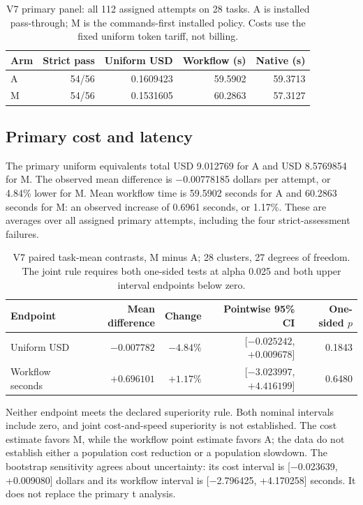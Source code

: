 \documentclass[manuscript,screen,nonacm]{acmart}
\begin{document}
\begin{table}[tbp]
\centering
\caption{V7 primary panel: all 112 assigned attempts on 28 tasks. A is installed pass-through; M is the commands-first installed policy. Costs use the fixed uniform token tariff, not billing.}
\label{tab:v7-arm-means}
\begin{tabular}{lrrrr}
\toprule
Arm & Strict pass & Uniform USD & Workflow (s) & Native (s) \\
\midrule
A & 54/56 & 0.1609423 & 59.5902 & 59.3713 \\
M & 54/56 & 0.1531605 & 60.2863 & 57.3127 \\
\bottomrule
\end{tabular}
\end{table}

\subsection{Primary cost and latency}\label{primary-cost-and-latency}

The primary uniform equivalents total USD 9.012769 for A and USD
8.5769854 for M. The observed mean difference is −0.00778185 dollars per
attempt, or 4.84\% lower for M. Mean workflow time is 59.5902 seconds
for A and 60.2863 seconds for M: an observed increase of 0.6961 seconds,
or 1.17\%. These are averages over all assigned primary attempts,
including the four strict-assessment failures.

\begin{table}[tbp]
\centering
\caption{V7 paired task-mean contrasts, M minus A; 28 clusters, 27 degrees of freedom. The joint rule requires both one-sided tests at alpha 0.025 and both upper interval endpoints below zero.}
\label{tab:v7-primary-contrasts}
\begin{tabular}{lrrrr}
\toprule
Endpoint & Mean difference & Change & Pointwise 95\% CI & One-sided $p$ \\
\midrule
Uniform USD & $-0.007782$ & $-4.84\%$ & [$-0.025242$, $+0.009678$] & 0.1843 \\
Workflow seconds & $+0.696101$ & $+1.17\%$ & [$-3.023997$, $+4.416199$] & 0.6480 \\
\bottomrule
\end{tabular}
\end{table}

Neither endpoint meets the declared superiority rule. Both nominal
intervals include zero, and joint cost-and-speed superiority is not
established. The cost estimate favors M, while the workflow point
estimate favors A; the data do not establish either a population cost
reduction or a population slowdown. The bootstrap sensitivity agrees
about uncertainty: its cost interval is {[}−0.023639, +0.009080{]}
dollars and its workflow interval is {[}−2.796425, +4.170258{]} seconds.
It does not replace the primary t analysis.
\end{document}
